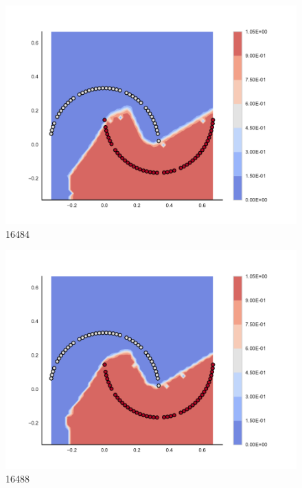 \begin{subfigure}[b]{0.09\textwidth}
    \includegraphics[clip, trim=2.35cm 1.75cm 4.5cm 0cm,width=\textwidth]{img/convergence/16484.pdf}
    \caption{16484}
    \label{fig:convergence_16484}
\end{subfigure}
%
\begin{subfigure}[b]{0.09\textwidth}
    \includegraphics[clip, trim=2.35cm 1.75cm 4.5cm 0cm,width=\textwidth]{img/convergence/16488.pdf}
    \caption{16488}
    \label{fig:convergence_16488}
\end{subfigure}
%
